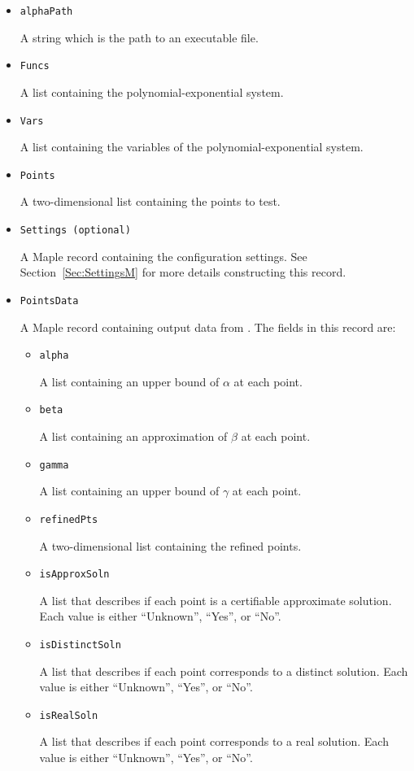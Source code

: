 \documentclass[11pt]{report}
\begin{document}
\begin{itemize}

\item {\tt alphaPath}

A string which is the path to an \alphaCertifiedS executable file.

\item {\tt Funcs}

A list containing the polynomial-exponential system.

\item {\tt Vars}

A list containing the variables of the polynomial-exponential system.

\item {\tt Points}

A two-dimensional list containing the points to test.

\item {\tt Settings (optional)}

A Maple record containing the configuration settings.
See Section~\ref{Sec:SettingsM} for more details constructing
this record.

\item {\tt PointsData}

A Maple record containing output data from \alphaCertified.
The fields in this record are:
\begin{itemize}
 \item {\tt alpha}

A list containing an upper bound of $\alpha$ at each point.

 \item {\tt beta}

A list containing an approximation of $\beta$ at each point.

 \item {\tt gamma}

A list containing an upper bound of $\gamma$ at each point.

 \item {\tt refinedPts}

A two-dimensional list containing the refined points.

 \item {\tt isApproxSoln}

A list that describes if each point is a certifiable approximate solution.
Each value is either ``Unknown'', ``Yes'', or ``No''.

 \item {\tt isDistinctSoln}

A list that describes if each point corresponds to a distinct solution.
Each value is either ``Unknown'', ``Yes'', or ``No''.

 \item {\tt isRealSoln}

A list that describes if each point corresponds to a real solution.
Each value is either ``Unknown'', ``Yes'', or ``No''.

\end{itemize}
\end{itemize}
\end{document}
